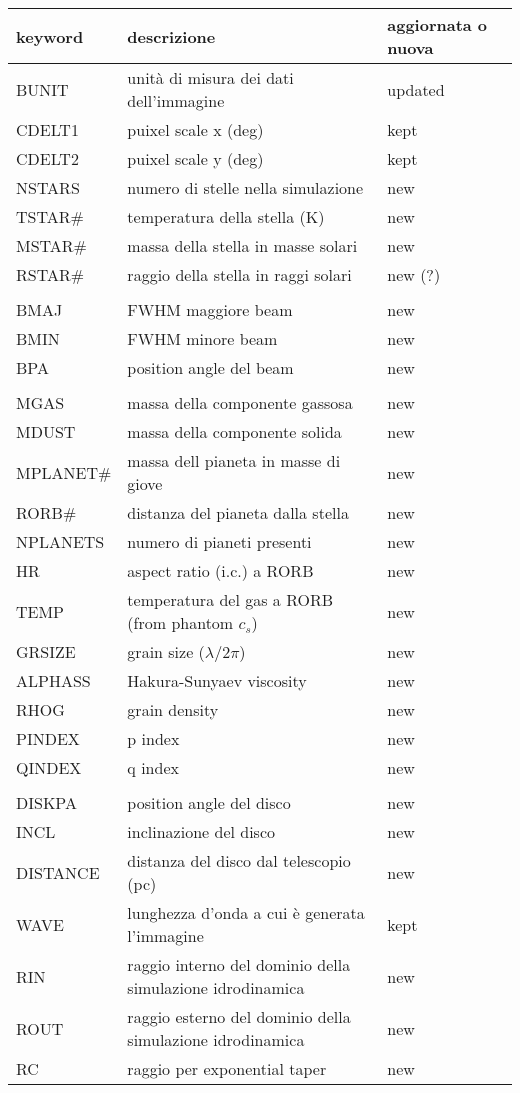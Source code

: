 \documentclass[DIN, pagenumber=false, fontsize=11pt, parskip=half]{scrartcl}
\begin{document}
\begin{center}
\begin{tabular}{l l l}
\toprule
keyword & descrizione & aggiornata o nuova\\
\midrule       
BUNIT & unità di misura dei dati dell'immagine & updated \\ 
CDELT1 & puixel scale x (deg) & kept \\
CDELT2 & puixel scale y (deg) & kept \\
NSTARS & numero di stelle nella simulazione & new \\
TSTAR\# & temperatura della stella (K) & new \\
MSTAR\# & massa della stella in masse solari & new \\
RSTAR\# & raggio della stella in raggi solari & new (?) \\ \\
BMAJ & FWHM maggiore beam & new \\
BMIN & FWHM minore beam & new \\
BPA & position angle del beam & new \\ \\
MGAS & massa della componente gassosa & new\\
MDUST & massa della componente solida & new \\
MPLANET\# & massa dell pianeta in masse di giove & new \\
RORB\# & distanza del pianeta dalla stella & new \\
NPLANETS & numero di pianeti presenti & new \\
HR & aspect ratio (i.c.)  a RORB & new \\ 
TEMP & temperatura del gas a RORB (from phantom $c_s$) & new\\
GRSIZE & grain size ($\lambda/2\pi$) & new \\
ALPHASS & Hakura-Sunyaev viscosity & new\\
RHOG & grain density & new \\
PINDEX & p index & new \\
QINDEX & q index & new \\ \\
DISKPA & position angle del disco & new \\
INCL & inclinazione del disco & new \\
DISTANCE & distanza del disco dal telescopio (pc) & new \\
WAVE & lunghezza d'onda a cui è generata l'immagine & kept \\
RIN & raggio interno del dominio della simulazione idrodinamica & new \\
ROUT & raggio esterno del dominio della simulazione idrodinamica & new \\
RC & raggio per exponential taper & new \\

 \bottomrule
\end{tabular}
\end{center}
\end{document}
